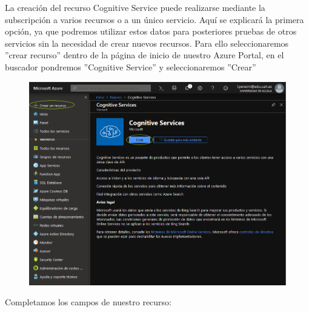 \documentclass[english,runningheads,a4paper]{llncs}[2018/03/10]
\begin{document}
    La creación del recurso Cognitive Service puede realizarse mediante la 
    subscripción a varios recursos o a un único servicio. Aquí se explicará la 
    primera opción, ya que podremos utilizar estos datos para posteriores 
    pruebas de otros servicios sin la necesidad de crear nuevos recursos. 
    Para ello seleccionaremos ''crear recurso'' dentro de la página de inicio 
    de nuestro Azure Portal, en el buscador pondremos ''Cognitive Service'' y 
    seleccionaremos ''Crear''
    
    \begin{figure}[H]
        
        \includegraphics[scale = 0.25]{./IA/AZURE/crearRecursoCS.png}
    \end{figure}
    \newpage Completamos los campos de nuestro recurso:
    
\end{document}
